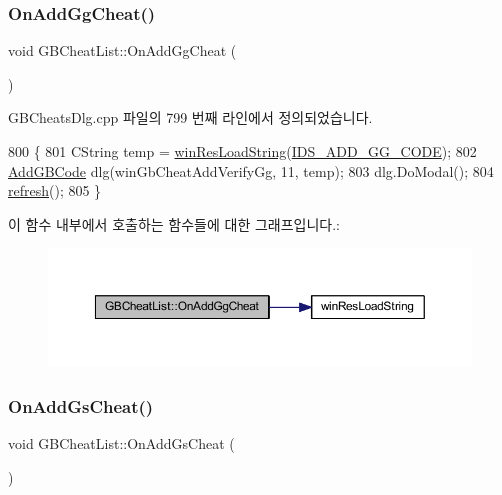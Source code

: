 \subsubsection{\texorpdfstring{On\+Add\+Gg\+Cheat()}{OnAddGgCheat()}}
{\footnotesize\ttfamily void G\+B\+Cheat\+List\+::\+On\+Add\+Gg\+Cheat (\begin{DoxyParamCaption}{ }\end{DoxyParamCaption})\hspace{0.3cm}{\ttfamily [protected]}}



G\+B\+Cheats\+Dlg.\+cpp 파일의 799 번째 라인에서 정의되었습니다.


\begin{DoxyCode}
800 \{
801   CString temp = \mbox{\hyperlink{_win_res_util_8cpp_a416e85e80ab9b01376e87251c83d1a5a}{winResLoadString}}(\mbox{\hyperlink{resource_8h_ada6c9cc992ff8cfadec402a7e7007511}{IDS\_ADD\_GG\_CODE}});
802   \mbox{\hyperlink{class_add_g_b_code}{AddGBCode}} dlg(winGbCheatAddVerifyGg, 11, temp);
803   dlg.DoModal();
804   \mbox{\hyperlink{class_g_b_cheat_list_a248cc28fa5e392d2f55d0f66ff6c5821}{refresh}}();
805 \}
\end{DoxyCode}
이 함수 내부에서 호출하는 함수들에 대한 그래프입니다.\+:
\nopagebreak
\begin{figure}[H]
\begin{center}
\leavevmode
\includegraphics[width=350pt]{class_g_b_cheat_list_a9bb70cfb03b60aae7f599000144df75e_cgraph}
\end{center}
\end{figure}
\mbox{\label{class_g_b_cheat_list_a50f8baaa9c1fc25bbddc698d1679b4c3}} 
\subsubsection{\texorpdfstring{On\+Add\+Gs\+Cheat()}{OnAddGsCheat()}}
{\footnotesize\ttfamily void G\+B\+Cheat\+List\+::\+On\+Add\+Gs\+Cheat (\begin{DoxyParamCaption}{ }\end{DoxyParamCaption})\hspace{0.3cm}{\ttfamily [protected]}}



